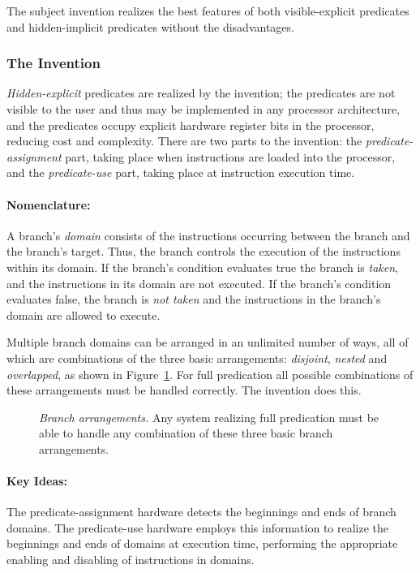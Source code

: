 \documentclass[10pt,dvips]{article}
\begin{document}
The subject invention realizes the best features of both visible-explicit
predicates and hidden-implicit predicates without the disadvantages.

\subsubsection{The Invention}
{\it Hidden-explicit} predicates are realized by the invention; the predicates
are not visible to the user and thus may be implemented in any processor
architecture, and the predicates occupy explicit hardware register bits in the
processor, reducing cost and complexity. There are two parts to the invention:
the {\it predicate-assignment} part, taking place when instructions are loaded
into the processor, and the {\it predicate-use} part, taking place at instruction
execution time.

\paragraph{Nomenclature: } A branch's {\it domain} consists of the instructions
occurring between the branch and the branch's target. Thus, the branch controls the
execution of the instructions within its domain. If the branch's condition
evaluates true the branch is {\it taken}, and the instructions in its domain
are not executed. If the branch's condition evaluates false, the branch is
{\it not taken} and the instructions in the branch's domain are allowed to
execute.

Multiple branch domains can be arranged in an unlimited number of ways, all of
which are combinations of the three basic arrangements: {\it disjoint}, {\it nested}
and {\it overlapped}, as shown in Figure~\ref{branchcombos}. For full predication
all possible combinations of these arrangements must be handled correctly. The
invention does this.

\begin{figure}
\centering
{}
\caption{{\em Branch arrangements.} Any system realizing full predication must be
able to handle any combination of these three basic branch arrangements.}
\label{branchcombos}
\end{figure}



\paragraph{Key Ideas: } The predicate-assignment hardware detects the beginnings
and ends of branch domains. The predicate-use hardware employs this information to
realize the beginnings and ends of domains at execution time, performing the
appropriate enabling and disabling of instructions in domains.
\end{document}
